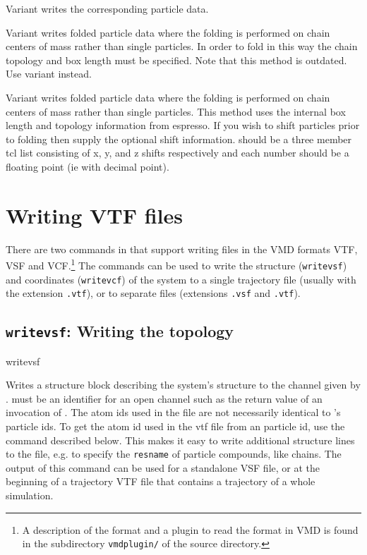 Variant  writes the corresponding particle data. 

Variant  writes folded particle data where the folding is
performed on chain centers of mass rather than single particles. In
order to fold in this way the chain topology and box length must be
specified.  Note that this method is outdated. Use variant 
instead.

Variant  writes folded particle data where the folding is
performed on chain centers of mass rather than single particles. This
method uses the internal box length and topology information from
espresso. If you wish to shift particles prior to folding then supply
the optional shift information.  should be a three member
tcl list consisting of x, y, and z shifts respectively and each number
should be a floating point (ie with decimal point).

\section{Writing VTF files}

There are two commands in \es{} that support writing files in the VMD
formats VTF, VSF and VCF.\footnote{A description of the format and a
  plugin to read the format in VMD is found in the subdirectory
  \texttt{vmdplugin/} of the \es{} source directory.} The commands can
be used to write the structure (\texttt{writevsf}) and coordinates
(\texttt{writevcf}) of the system to a single trajectory file (usually
with the extension \texttt{.vtf}), or to separate files (extensions
\texttt{.vsf} and \texttt{.vtf}).

\subsection{\texttt{writevsf}: Writing the topology}

\begin{essyntax}
  writevsf  
\end{essyntax}
Writes a structure block describing the system's structure to the
channel given by .  must be an
identifier for an open channel such as the return value of an
invocation of . The atom ids used in the file are not
necessarily identical to \es's particle ids. To get the atom id used
in the vtf file from an \es particle id, use the command
 described below. This makes it easy to write
additional structure lines to the file, e.g. to specify the
\texttt{resname} of particle compounds, like chains.  The output of
this command can be used for a standalone VSF file, or at the
beginning of a trajectory VTF file that contains a trajectory of a
whole simulation.

